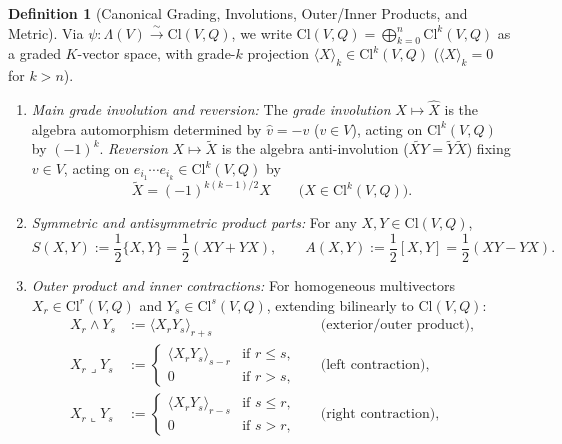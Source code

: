 \documentclass[11pt]{article}
\newcommand{\coloneqq}{\mathrel{:=}}
\theoremstyle{plain}
\theoremstyle{definition}
\newtheorem{definition}[theorem]{Definition}
\theoremstyle{remark}
\newcommand{\Cl}{\mathrm{Cl}}
\newcommand{\grade}[2]{\langle #1 \rangle_{#2}}
\newcommand{\lcontract}{\mathbin{\lrcorner}}
\newcommand{\rcontract}{\mathbin{\llcorner}}
\begin{document}
\begin{definition}[Canonical Grading, Involutions, Outer/Inner Products, and Metric]\label{def:ops}
Via $\psi : \Lambda(V) \xrightarrow{\sim} \Cl(V, Q)$, we write $\Cl(V, Q) = \bigoplus_{k=0}^n \Cl^k(V, Q)$ as a graded $K$-vector space, with grade-$k$ projection $\grade{X}{k} \in \Cl^k(V, Q)$ ($\grade{X}{k} = 0$ for $k > n$).
\begin{enumerate}
  \item[(i)] \emph{Main grade involution and reversion:} The \emph{grade involution} $X \mapsto \widehat{X}$ is the algebra automorphism determined by $\widehat{v} = -v$ ($v \in V$), acting on $\Cl^k(V, Q)$ by $(-1)^k$. \emph{Reversion} $X \mapsto \widetilde{X}$ is the algebra anti-involution ($\widetilde{X Y} = \widetilde{Y}\widetilde{X}$) fixing $v \in V$, acting on $e_{i_1}\cdots e_{i_k} \in \Cl^k(V, Q)$ by
  \begin{equation}\label{eq:rev-sign}
    \widetilde{X} = (-1)^{k(k-1)/2} X \qquad \bigl(X \in \Cl^k(V, Q)\bigr).
  \end{equation}
  \item[(ii)] \emph{Symmetric and antisymmetric product parts:} For any $X, Y \in \Cl(V, Q)$,
  \begin{equation}\label{eq:sym-antisym}
    S(X, Y) \coloneqq \frac{1}{2}\{X, Y\} = \frac{1}{2}(X Y + Y X), \qquad
    A(X, Y) \coloneqq \frac{1}{2}[X, Y] = \frac{1}{2}(X Y - Y X).
  \end{equation}
  \item[(iii)] \emph{Outer product and inner contractions:} For homogeneous multivectors $X_r \in \Cl^r(V, Q)$ and $Y_s \in \Cl^s(V, Q)$, extending bilinearly to $\Cl(V, Q)$:
  \begin{align}
    X_r \wedge Y_s &\coloneqq \grade{X_r Y_s}{r + s} && \text{(exterior/outer product)},\label{eq:wedge}\\
    X_r \lcontract Y_s &\coloneqq \begin{cases}\grade{X_r Y_s}{s - r} & \text{if } r \le s,\\ 0 & \text{if } r > s,\end{cases} && \text{(left contraction)},\label{eq:lcontract}\\
    X_r \rcontract Y_s &\coloneqq \begin{cases}\grade{X_r Y_s}{r - s} & \text{if } s \le r,\\ 0 & \text{if } s > r,\end{cases} && \text{(right contraction)},\label{eq:rcontract}\\

\end{align}
\end{enumerate}
\end{definition}
\end{document}
